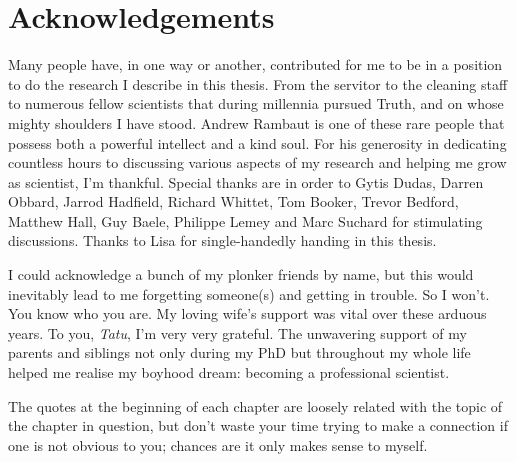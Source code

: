 \chapter{Acknowledgements}

Many people have, in one way or another, contributed for me to be in a position to do the research I describe in this thesis.
From the servitor to the cleaning staff to numerous fellow scientists that during millennia pursued Truth, and on whose mighty shoulders I have stood.
Andrew Rambaut is one of these rare people that possess both a powerful intellect and a kind soul.
For his generosity in dedicating countless hours to discussing various aspects of my research and helping me grow as scientist, I'm thankful.
Special thanks are in order to Gytis Dudas, Darren Obbard, Jarrod Hadfield, Richard Whittet, Tom Booker, Trevor Bedford, Matthew Hall, Guy Baele, Philippe Lemey and Marc Suchard for stimulating discussions.
Thanks to Lisa for single-handedly handing in this thesis.

I could acknowledge a bunch of my plonker friends by name, but this would inevitably lead to me forgetting someone(s) and getting in trouble.
So I won't.
You know who you are.
My loving wife's support was vital over these arduous years.
To you, \textit{Tatu}, I'm very very grateful.
The unwavering support of my parents and siblings not only during my PhD but throughout my whole life helped me realise my boyhood dream: becoming a professional scientist.

The quotes at the beginning of each chapter are loosely related with the topic of the chapter in question, but don't waste your time trying to make a connection if one is not obvious to you; chances are it only makes sense to myself.
